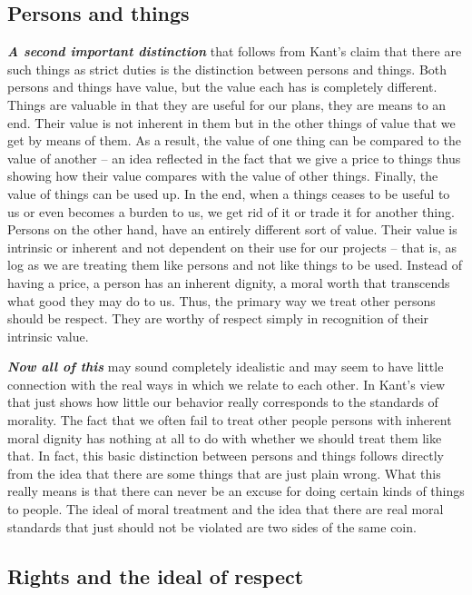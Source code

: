 \documentclass[12pt, openany]{book}
\begin{document}
\hypertarget{persons-and-things}{%
\subsection*{Persons and things}\label{persons-and-things}}


\textbf{\emph{A second important distinction}} that follows from Kant's claim that there are such things as strict duties is the distinction between persons and things. Both persons and things have value, but the value each has is completely different. Things are valuable in that they are useful for our plans, they are means to an end. Their value is not inherent in them but in the other things of value that we get by means of them. As a result, the value of one thing can be compared to the value of another -- an idea reflected in the fact that we give a price to things thus showing how their value compares with the value of other things. Finally, the value of things can be used up. In the end, when a things ceases to be useful to us or even becomes a burden to us, we get rid of it or trade it for another thing. Persons on the other hand, have an entirely different sort of value. Their value is intrinsic or inherent and not dependent on their use for our projects -- that is, as log as we are treating them like persons and not like things to be used. Instead of having a price, a person has an inherent dignity, a moral worth that transcends what good they may do to us. Thus, the primary way we treat other persons should be respect. They are worthy of respect simply in recognition of their intrinsic value.

\textbf{\emph{Now all of this}} may sound completely idealistic and may seem to have little connection with the real ways in which we relate to each other. In Kant's view that just shows how little our behavior really corresponds to the standards of morality. The fact that we often fail to treat other people persons with inherent moral dignity has nothing at all to do with whether we should treat them like that. In fact, this basic distinction between persons and things follows directly from the idea that there are some things that are just plain wrong. What this really means is that there can never be an excuse for doing certain kinds of things to people. The ideal of moral treatment and the idea that there are real moral standards that just should not be violated are two sides of the same coin.

\hypertarget{rights-and-the-ideal-of-respect}{%
\subsection*{Rights and the ideal of respect}\label{rights-and-the-ideal-of-respect}}
\end{document}
